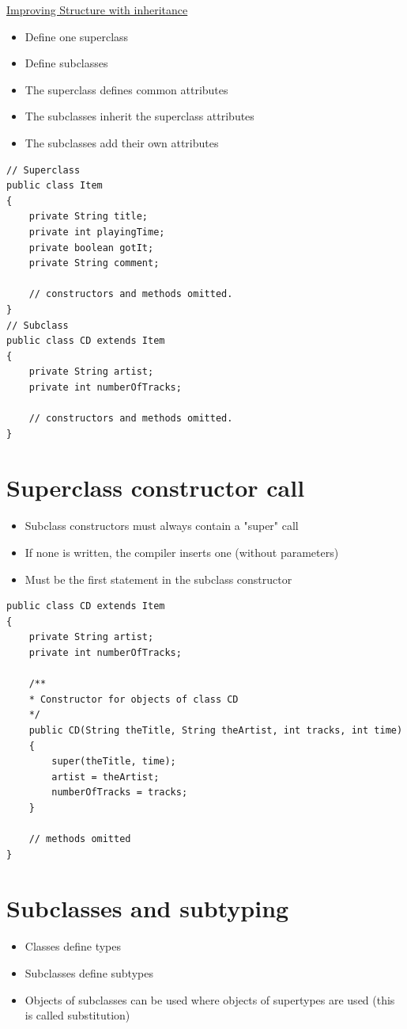 \documentclass{article}[18pt]
\begin{document}
\begin{center}
\underline{\huge Improving Structure with inheritance}
\end{center}
\begin{itemize}
	\item Define one superclass
	\item Define subclasses
	\item The superclass defines common attributes
	\item The subclasses inherit the superclass attributes
	\item The subclasses add their own attributes
\end{itemize}
\begin{verbatim}
// Superclass
public class Item
{
	private String title;
	private int playingTime;
	private boolean gotIt;
	private String comment;
	
	// constructors and methods omitted.
}
// Subclass
public class CD extends Item
{
	private String artist;
	private int numberOfTracks;
	
	// constructors and methods omitted.
}
\end{verbatim}
\section{Superclass constructor call}
\begin{itemize}
	\item Subclass constructors must always contain a "super" call
	\item If none is written, the compiler inserts one (without parameters)
	\item Must be the first statement in the subclass constructor
\end{itemize}
\begin{verbatim}
public class CD extends Item
{
	private String artist;
	private int numberOfTracks;
	
	/**
	* Constructor for objects of class CD
	*/
	public CD(String theTitle, String theArtist, int tracks, int time)
	{
		super(theTitle, time);
		artist = theArtist;
		numberOfTracks = tracks;
	}
	
	// methods omitted
}
\end{verbatim}
\section{Subclasses and subtyping}
\begin{itemize}
	\item Classes define types
	\item Subclasses define subtypes
	\item Objects of subclasses can be used where objects of supertypes are used (this is called substitution)
\end{itemize}
\end{document}
